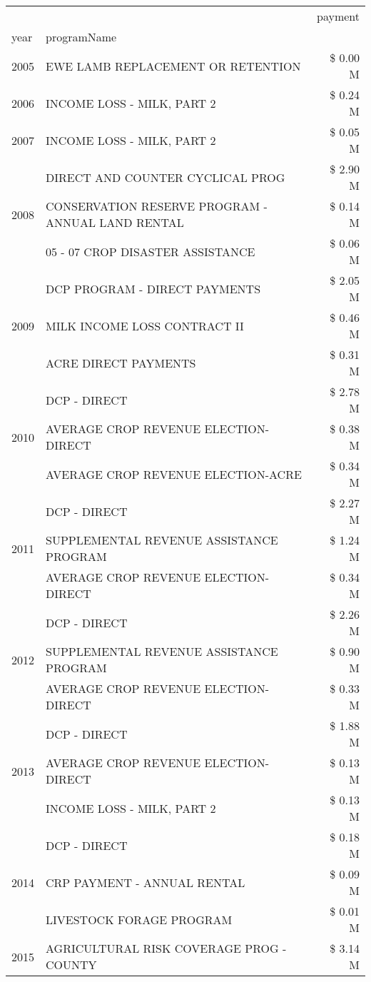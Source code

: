 \begin{tabular}{llr}
\toprule
 &  & payment \\
year & programName &  \\
\midrule
2005 & EWE LAMB REPLACEMENT OR RETENTION & \$ 0.00 M \\
\cline{1-3}
2006 & INCOME LOSS - MILK, PART 2 & \$ 0.24 M \\
\cline{1-3}
2007 & INCOME LOSS - MILK, PART 2 & \$ 0.05 M \\
\cline{1-3}
\multirow[t]{3}{*}{2008} & DIRECT AND COUNTER CYCLICAL PROG & \$ 2.90 M \\
 & CONSERVATION RESERVE PROGRAM - ANNUAL LAND RENTAL & \$ 0.14 M \\
 & 05 - 07 CROP DISASTER ASSISTANCE & \$ 0.06 M \\
\cline{1-3}
\multirow[t]{3}{*}{2009} & DCP PROGRAM - DIRECT PAYMENTS & \$ 2.05 M \\
 & MILK INCOME LOSS CONTRACT II & \$ 0.46 M \\
 & ACRE DIRECT PAYMENTS & \$ 0.31 M \\
\cline{1-3}
\multirow[t]{3}{*}{2010} & DCP - DIRECT & \$ 2.78 M \\
 & AVERAGE CROP REVENUE ELECTION-DIRECT & \$ 0.38 M \\
 & AVERAGE CROP REVENUE ELECTION-ACRE & \$ 0.34 M \\
\cline{1-3}
\multirow[t]{3}{*}{2011} & DCP - DIRECT & \$ 2.27 M \\
 & SUPPLEMENTAL REVENUE ASSISTANCE PROGRAM & \$ 1.24 M \\
 & AVERAGE CROP REVENUE ELECTION-DIRECT & \$ 0.34 M \\
\cline{1-3}
\multirow[t]{3}{*}{2012} & DCP - DIRECT & \$ 2.26 M \\
 & SUPPLEMENTAL REVENUE ASSISTANCE PROGRAM & \$ 0.90 M \\
 & AVERAGE CROP REVENUE ELECTION-DIRECT & \$ 0.33 M \\
\cline{1-3}
\multirow[t]{3}{*}{2013} & DCP - DIRECT & \$ 1.88 M \\
 & AVERAGE CROP REVENUE ELECTION-DIRECT & \$ 0.13 M \\
 & INCOME LOSS - MILK, PART 2 & \$ 0.13 M \\
\cline{1-3}
\multirow[t]{3}{*}{2014} & DCP - DIRECT & \$ 0.18 M \\
 & CRP PAYMENT - ANNUAL RENTAL & \$ 0.09 M \\
 & LIVESTOCK FORAGE PROGRAM & \$ 0.01 M \\
\cline{1-3}
\multirow[t]{3}{*}{2015} & AGRICULTURAL RISK COVERAGE PROG - COUNTY & \$ 3.14 M \\

\end{tabular}

